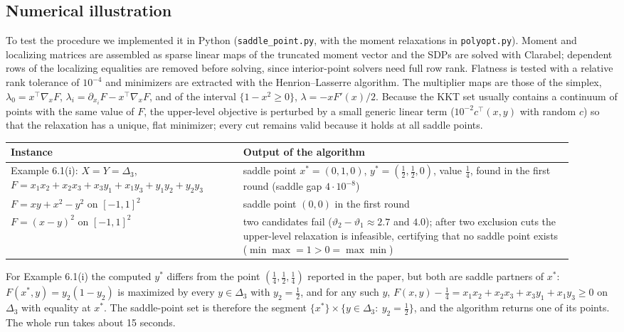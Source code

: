 \documentclass[11pt]{article}
\begin{document}
\subsection{Numerical illustration}
To test the procedure we implemented it in Python (\texttt{saddle\_point.py}, with the moment
relaxations in \texttt{polyopt.py}). Moment and localizing matrices are assembled as sparse linear
maps of the truncated moment vector and the SDPs are solved with Clarabel; dependent rows of the
localizing equalities are removed before solving, since interior-point solvers need full row rank.
Flatness is tested with a relative rank tolerance of $10^{-4}$ and minimizers are extracted with the
Henrion--Lasserre algorithm. The multiplier maps are those of the simplex,
$\lambda_0=x^\top\nabla_xF$, $\lambda_i=\partial_{x_i}F-x^\top\nabla_xF$, and of the interval
$\{1-x^2\ge0\}$, $\lambda=-xF'(x)/2$. Because the KKT set usually contains a continuum of points with
the same value of $F$, the upper-level objective is perturbed by a small generic linear term
($10^{-2}c^\top(x,y)$ with random $c$) so that the relaxation has a unique, flat minimizer; every
cut remains valid because it holds at all saddle points.

\begin{center}
\begin{tabular}{p{0.38\linewidth}p{0.54\linewidth}}
\hline
Instance & Output of the algorithm\\
\hline
Example 6.1(i): $X=Y=\Delta_3$, $F=x_1x_2+x_2x_3+x_3y_1+x_1y_3+y_1y_2+y_2y_3$ &
saddle point $x^\ast=(0,1,0)$, $y^\ast=(\tfrac12,\tfrac12,0)$, value $\tfrac14$, found in the first
round (saddle gap $4\cdot10^{-8}$)\\
$F=xy+x^2-y^2$ on $[-1,1]^2$ & saddle point $(0,0)$ in the first round\\
$F=(x-y)^2$ on $[-1,1]^2$ & two candidates fail ($\vartheta_2-\vartheta_1\approx2.7$ and $4.0$);
after two exclusion cuts the upper-level relaxation is infeasible, certifying that no saddle point
exists ($\min\max=1>0=\max\min$)\\
\hline
\end{tabular}
\end{center}

For Example 6.1(i) the computed $y^\ast$ differs from the point $(\tfrac14,\tfrac12,\tfrac14)$
reported in the paper, but both are saddle partners of $x^\ast$: $F(x^\ast,y)=y_2(1-y_2)$ is maximized by
every $y\in\Delta_3$ with $y_2=\tfrac12$, and for any such $y$,
$F(x,y)-\tfrac14=x_1x_2+x_2x_3+x_3y_1+x_1y_3\ge0$ on $\Delta_3$ with equality at $x^\ast$. The
saddle-point set is therefore the segment $\{x^\ast\}\times\{y\in\Delta_3:\ y_2=\tfrac12\}$, and the
algorithm returns one of its points. The whole run takes about 15 seconds.
\end{document}
